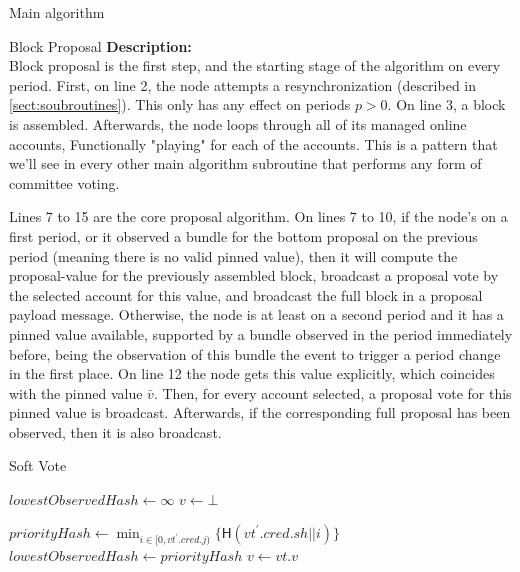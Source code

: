 \documentclass[10pt,a4paper]{article}
\begin{document}
\begin{section}{Main algorithm}
\begin{subsection}{Block Proposal}
\newpage
\noindent \textbf{Description:}\\
Block proposal is the first step, and the starting stage of the algorithm on every period.
First, on line 2, the node attempts a resynchronization (described in \ref{sect:soubroutines}). 
This only has any effect on periods $p > 0$. On line 3, a block is assembled.
Afterwards, the node loops through all of its managed online accounts, Functionally
"playing" for each of the accounts. This is a pattern that we'll see in every other
main algorithm subroutine that performs any form of committee voting.

Lines 7 to 15 are the core proposal algorithm. On lines 7 to 10, 
if the node's on a first period, or it observed a bundle for the bottom proposal on the previous 
period (meaning there is no valid pinned value), then it will compute the proposal-value for the 
previously assembled block, broadcast a proposal vote by the selected account for this value, and 
broadcast the full block in a proposal payload message.
Otherwise, the node is at least on a second period and it has a pinned value available, supported by a 
bundle observed in the period immediately before, being the observation of this bundle the event to trigger 
a period change in the first place. On line 12 the node gets this value explicitly, which coincides with the pinned
value $\bar{v}$. 
Then, for every account selected, a proposal vote for this pinned value is broadcast. Afterwards, 
if the corresponding full proposal has been observed, then it is also broadcast.


\end{subsection}
\begin{subsection}{Soft Vote}\label{ssect:softvote}

\begin{algorithm}[H]
    \caption{\underline{Soft Vote}}
    \label{algo:soft-vote}
    \begin{algorithmic}[1]
    \State $lowestObservedHash \gets \infty$
    \State $v \gets \bot$ 

        \State $priorityHash \gets \min_{i \in [0, vt^\prime.cred.j)} \{ \mathsf{H}(vt^\prime.cred.sh || i)\}$
            \State $lowestObservedHash \gets priorityHash$
            \State $v \gets vt.v$
        \EndIf    
    \EndFor


\end{algorithmic}
\end{algorithm}
\end{subsection}
\end{section}
\end{document}
